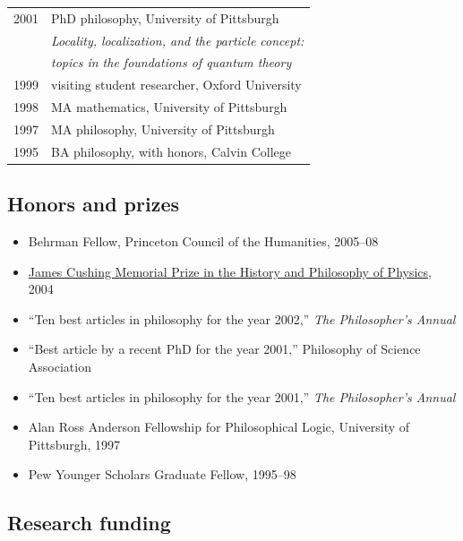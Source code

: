 \documentclass[11pt]{article}
\makeatletter
\newenvironment{dated}[1][ll]%
  {\begin{tabular}{@{}#1}}%
  {\end{tabular}}
\makeatother
\begin{document}
\begin{dated}
  2001 & PhD philosophy, University of Pittsburgh \\
       & \hspace{1em}\emph{Locality, localization, and the particle concept:} \\
       & \hspace{1em}\emph{topics in the foundations of quantum theory} \\
  1999 & visiting student researcher, Oxford University \\
  1998 & MA mathematics, University of Pittsburgh \\
  1997 & MA philosophy, University of Pittsburgh \\
  1995 & BA philosophy, with honors, Calvin College
\end{dated}


\subsection*{Honors and prizes}

\begin{itemize}
\item Behrman Fellow, Princeton Council of the Humanities, 2005--08
\item \href{https://www3.nd.edu/~cushpriz/}{James Cushing Memorial Prize in
  the History and Philosophy of Physics}, 2004
\item ``Ten best articles in philosophy for the year 2002,''
  \textit{The Philosopher's Annual}
\item ``Best article by a recent PhD for the year 2001,'' Philosophy of
  Science Association
\item ``Ten best articles in philosophy for the year 2001,''
  \textit{The Philosopher's Annual}
\item Alan Ross Anderson Fellowship for Philosophical Logic, University of
  Pittsburgh, 1997
\item Pew Younger Scholars Graduate Fellow, 1995--98
\end{itemize}

\subsection*{Research funding}
\end{document}
